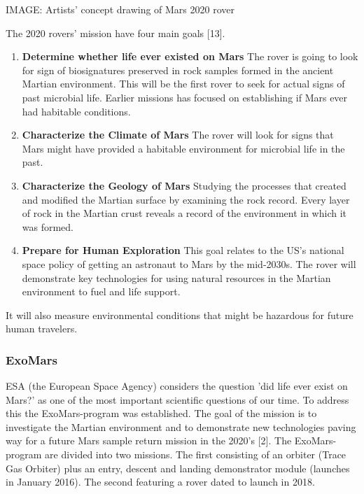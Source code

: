 
IMAGE: Artists’ concept drawing of Mars 2020 rover

The 2020 rovers’ mission have four main goals [13].

\begin{enumerate}
	\item \textbf{Determine whether life ever existed on Mars}
The rover is going to look for sign of biosignatures preserved in rock samples formed in the ancient Martian environment.
This will be the first rover to seek for actual signs of past microbial life.
Earlier missions has focused on establishing if Mars ever had habitable conditions.
	\item \textbf{Characterize the Climate of Mars}
The rover will look for signs that Mars might have provided a habitable environment for microbial life in the past.
	\item \textbf{Characterize the Geology of Mars}
Studying the processes that created and modified the Martian surface by examining the rock record.
Every layer of rock in the Martian crust reveals a record of the environment in which it was formed.
	\item \textbf{Prepare for Human Exploration}
This goal relates to the US’s national space policy of getting an astronaut to Mars by the mid-2030s.
The rover will demonstrate key technologies for using natural resources in the Martian environment to fuel and life support.
\end{enumerate}

It will also measure environmental conditions that might be hazardous for future human travelers. 

\subsubsection*{ExoMars}

ESA (the European Space Agency) considers the question 'did life ever exist on Mars?' as one of the most important scientific questions of our time.
To address this the ExoMars-program was established.
The goal of the mission is to investigate the Martian environment and to demonstrate new technologies paving way for a future Mars sample return mission in the 2020’s [2]. 
The ExoMars-program are divided into two missions.
The first consisting of an orbiter (Trace Gas Orbiter) plus an entry, descent and landing demonstrator module (launches in January 2016).
The second featuring a rover dated to launch in 2018.
 
